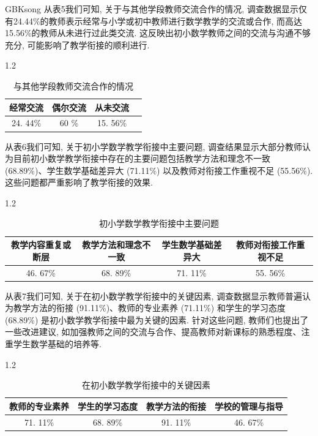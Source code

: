 \documentclass[a4paper,12pt,twoside]{ctexart}
\begin{document}
\begin{CJK*}{GBK}{song}
从表5我们可知, 关于与其他学段教师交流合作的情况, 调查数据显示仅有24.44\%的教师表示经常与小学或初中教师进行数学教学的交流或合作, 而高达15.56\%的教师从未进行过此类交流. 这反映出初小数学教师之间的交流与沟通不够充分, 可能影响了教学衔接的顺利进行.
\begin{spacing}{1.2}
\vspace*{-15pt}
\begin{table}[H]
 \center
 \caption{\label{tabrecord}与其他学段教师交流合作的情况}\medskip
\begin{tabular}{|c|c|c|c|}
\hline
经常交流    & 偶尔交流    & 从未交流  \\ \hline
24. 44\% & 60    \% & 15. 56\%  \\ \hline
\end{tabular}
\end{table}\vspace*{-8pt}
\end{spacing}

从表6我们可知, 关于初小学数学教学衔接中主要问题, 调查结果显示大部分教师认为目前初小数学教学衔接中存在的主要问题包括教学方法和理念不一致 (68.89\%)、学生数学基础差异大 (71.11\%) 以及教师对衔接工作重视不足 (55.56\%). 这些问题都严重影响了教学衔接的效果.
\begin{spacing}{1.2}
\vspace*{-15pt}
\begin{table}[H]
 \center
 \caption{\label{tabrecord}初小学数学教学衔接中主要问题}\medskip
\begin{tabular}{|c|c|c|c|}
\hline
教学内容重复或断层  & 教学方法和理念不一致    & 学生数学基础差异大     & 教师对衔接工作重视不足   \\ \hline
46. 67\% & 68. 89\% & 71. 11\% & 55. 56\% \\ \hline
\end{tabular}
\end{table}\vspace*{-8pt}
\end{spacing}

从表7我们可知, 关于在初小数学教学衔接中的关键因素, 调查数据显示教师普遍认为教学方法的衔接 (91.11\%)、教师的专业素养 (71.11\%) 和学生的学习态度 (68.89\%) 是初小数学教学衔接中最为关键的因素. 针对这些问题, 教师们也提出了一些改进建议, 如加强教师之间的交流与合作、提高教师对新课标的熟悉程度、注重学生数学基础的培养等.
\begin{spacing}{1.2}
\vspace*{-15pt}
\begin{table}[H]
 \center
 \caption{\label{tabrecord}在初小数学教学衔接中的关键因素}\medskip
\begin{tabular}{|c|c|c|c|}
\hline
教师的专业素养  & 学生的学习态度    & 教学方法的衔接     & 学校的管理与指导   \\ \hline
71. 11\% & 68. 89\% & 91. 11\% & 46. 67\% \\ \hline
\end{tabular}
\end{table}
\end{spacing}


\end{CJK*}
\end{document}
